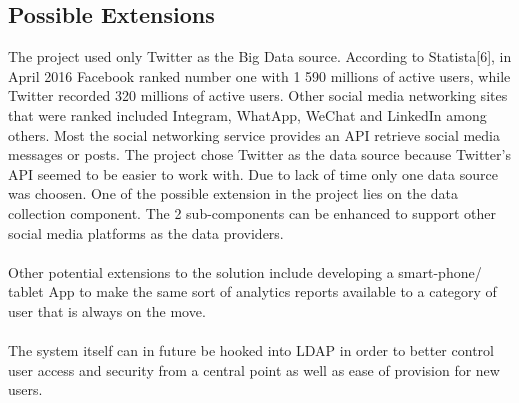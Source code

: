 \documentclass[12pt]{article} %
\begin{document}
	\subsection{Possible Extensions}
	
	The project used only Twitter as the Big Data source. According to Statista[6], in April 2016 Facebook ranked number one with 1 590 millions of active users, while Twitter recorded 320 millions of active users. Other social media networking sites that were ranked included Integram, WhatApp, WeChat and LinkedIn among others. Most the social networking service provides an API retrieve social media messages or posts. The project chose Twitter as the data source because Twitter's API seemed to be easier to work with. Due to lack of time only one data source was choosen. One of the possible extension in the project lies on the data collection component. The 2 sub-components can be enhanced to support other social media platforms as the data providers.
	\\
	\\
	Other potential extensions to the solution include developing a smart-phone/ tablet App to make the same sort of analytics reports available to a category of user that is always on the move.
	\\
	\\
	The system itself can in future be hooked into LDAP in order to better control user access and security from a central point as well as ease of provision for new users.
	
	
	
	
	
	
	
\end{document}
